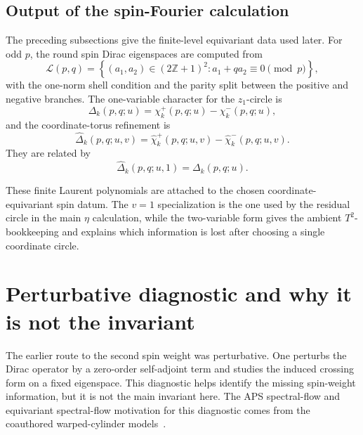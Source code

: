 \documentclass{article}
\theoremstyle{definition}
\numberwithin{equation}{section}
\begin{document}
\subsection{Output of the spin-Fourier calculation}
\label{subsec:stage-1E-stage-1-output}

The preceding subsections give the finite-level equivariant data used later.  For odd $p$, the round spin Dirac eigenspaces are computed from
\begin{equation}
\mathcal L(p,q)=
\left\{(a_1,a_2)\in(2\mathbb Z+1)^2:
a_1+qa_2\equiv0\pmod p\right\},
\end{equation}
with the one-norm shell condition and the parity split between the positive and negative branches.  The one-variable character for the $z_1$-circle is
\begin{equation}
\Delta_k(p,q;u)=\chi_k^+(p,q;u)-\chi_k^-(p,q;u),
\end{equation}
and the coordinate-torus refinement is
\begin{equation}
\widehat\Delta_k(p,q;u,v)
=
\widehat\chi_k^+(p,q;u,v)
-
\widehat\chi_k^-(p,q;u,v).
\end{equation}
They are related by
\begin{equation}
\widehat\Delta_k(p,q;u,1)=\Delta_k(p,q;u).
\end{equation}

These finite Laurent polynomials are attached to the chosen coordinate-equivariant spin datum.  The $v=1$ specialization is the one used by the residual circle in the main $\eta$ calculation, while the two-variable form gives the ambient $T^2$-bookkeeping and explains which information is lost after choosing a single coordinate circle.


\FloatBarrier


\section{Perturbative diagnostic and why it is not the invariant}
\label{sec:perturbative-diagnostic-short}

The earlier route to the second spin weight was perturbative.  One perturbs the Dirac operator by a zero-order self-adjoint term and studies the induced crossing form on a fixed eigenspace.  This diagnostic helps identify the missing spin-weight information, but it is not the main invariant here.  The APS spectral-flow and equivariant spectral-flow motivation for this diagnostic comes from the coauthored warped-cylinder models~\cite{KimuraSharmaWarpedCylinder,KimuraSharmaReflection}.
\end{document}
